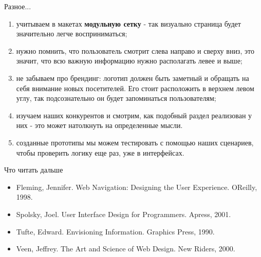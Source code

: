 \documentclass{beamer}
\begin{document}
\begin{frame}[t]{Разное...}
\begin{enumerate}
\item учитываем в макетах \textbf{модульную сетку} - так визуально страница будет значительно легче восприниматься; 
\item нужно помнить, что пользователь смотрит слева направо и сверху вниз, это значит, что всю важную информацию нужно располагать левее и выше;
\item не забываем про брендинг: логотип должен быть заметный и обращать на себя внимание новых посетителей. Его стоит расположить в верхнем левом углу, так подсознательно он будет запоминаться пользователям;
\item изучаем наших конкурентов и смотрим, как подобный раздел реализован у них - это может натолкнуть на определенные мысли.
\item созданные прототипы мы можем тестировать с помощью наших сценариев, чтобы проверить логику еще раз, уже в интерфейсах.
\end{enumerate}
\end{frame}

\begin{frame}[t]{Что читать дальше}
\begin{itemize}
\item Fleming, Jennifer. Web Navigation: Designing the User Experience. OReilly, 1998.
\item Spolsky, Joel. User Interface Design for Programmers. Apress, 2001.
\item Tufte, Edward. Envisioning Information. Graphics Press, 1990.
\item Veen, Jeffrey. The Art and Science of Web Design. New Riders, 2000.
\end{itemize}
\end{frame}
\end{document}
